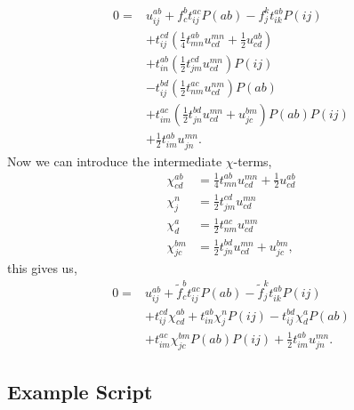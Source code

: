\documentclass[
    a4paper, aps, twocolumn, floatfix, superscriptaddress,
    nofootinbib]{revtex4-1}
\newcommand{\1}{\mathds{1}}
\begin{document}
    \begin{equation}
        \begin{aligned}
        0 =& u^{ab}_{ij} + f^b_c t^{ac}_{ij}P(ab) - f^k_jt^{ab}_{ik}P(ij) \\
          &+ t^{cd}_{ij} \left(\frac{1}{4}t^{ab}_{mn} u^{mn}_{cd} + \frac{1}{2} u^{ab}_{cd} \right) \\
          &+  t^{ab}_{in} \left(\frac{1}{2} t^{cd}_{jm} u^{mn}_{cd}\right) P(ij) \\
          &- t^{bd}_{ij} \left(\frac{1}{2}t^{ac}_{nm}  u^{nm}_{cd}\right) P(ab) \\
          &+ t^{ac}_{im}\left(\frac{1}{2} t^{bd}_{jn} u^{mn}_{cd} + u^{bm}_{jc} \right)P(ab) P(ij) \\
          &+ \frac{1}{2}t^{ab}_{im} u^{mn}_{jn}.
        \end{aligned}
    \end{equation}
    Now we can introduce the intermediate $\chi$-terms,
    \begin{align}
        \chi^{ab}_{cd} &= \frac{1}{4}t^{ab}_{mn} u^{mn}_{cd} + \frac{1}{2}u^{ab}_{cd} \\
        \chi^n_j &= \frac{1}{2}t^{cd}_{jm} u^{mn}_{cd} \\
        \chi^a_d &= \frac{1}{2} t^{ac}_{nm} u^{nm}_{cd} \\
        \chi^{bm}_{jc} &= \frac{1}{2}t^{bd}_{jn}u^{mn}_{cd} + u^{bm}_{jc},
    \end{align}
    this gives us,
    \begin{equation}
        \begin{aligned}
            0 =& u^{ab}_{ij} + \tilde{f}^b_c t^{ac}_{ij}P(ab) - \tilde{f}^k_jt^{ab}_{ik}P(ij) \\
              &+ t^{cd}_{ij}\chi^{ab}_{cd} + t^{ab}_{in}\chi^n_jP(ij)
               - t^{bd}_{ij}\chi^a_dP(ab) \\
              &+ t^{ac}_{im}\chi^{bm}_{jc}P(ab)P(ij) + \frac{1}{2}t^{ab}_{im}u^{mn}_{jn}.
        \end{aligned}
    \end{equation}


\vfill
\clearpage
\newpage
\begin{widetext}
\section{Example Script}

    \label{app:sample_script}

    \vspace{10pt}
    
    \inputminted[firstline=0, lastline=113]{python}{../scripts/comparison.py}

\end{widetext}


\end{document}
